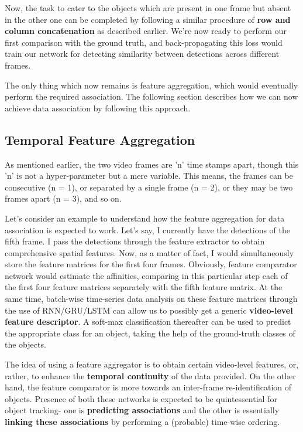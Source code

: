 \documentclass[a4paper]{article}
\begin{document}
    Now, the task to cater to the objects which are present in one frame but absent in the other one can be completed by following a similar procedure of \textbf{row and column concatenation} as described earlier. We're now ready to perform our first comparison with the ground truth, and back-propagating this loss would train our network for detecting similarity between detections across different frames.
    
    The only thing which now remains is feature aggregation, which would eventually perform the required association. The following section describes how we can now achieve data association by following this approach.

    \subsection{Temporal Feature Aggregation}
    As mentioned earlier, the two video frames are 'n' time stamps apart, though this 'n' is not a hyper-parameter but a mere variable. This means, the frames can be consecutive (n = 1), or separated by a single frame (n = 2), or they may be two frames apart (n = 3), and so on.
    
    Let’s consider an example to understand how the feature aggregation for data association is expected to work. Let’s say, I currently have the detections of the fifth frame. I pass the detections through the feature extractor to obtain comprehensive spatial features. Now, as a matter of fact, I would simultaneously store the feature matrices for the first four frames. Obviously, feature comparator network would estimate the affinities, comparing in this particular step each of the first four feature matrices separately with the fifth feature matrix. At the same time, batch-wise time-series data analysis on these feature matrices through the use of RNN/GRU/LSTM can allow us to possibly get a generic \textbf{video-level feature descriptor}. A soft-max classification thereafter can be used to predict the appropriate class for an object, taking the help of the ground-truth classes of the objects. 
    
    The idea of using a feature aggregator is to obtain certain video-level features, or, rather, to enhance the \textbf{temporal continuity} of the data provided. On the other hand, the feature comparator is more towards an inter-frame re-identification of objects. Presence of both these networks is expected to be quintessential for object tracking- one is \textbf{predicting associations} and the other is essentially \textbf{linking these associations} by performing a (probable) time-wise ordering.
\end{document}
